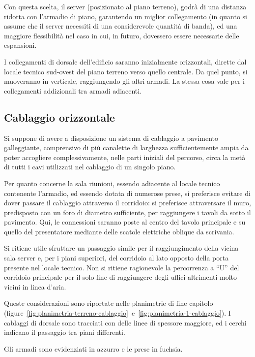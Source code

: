 Con questa scelta, il server (posizionato al piano terreno), godrà di una distanza ridotta con l'armadio di piano, garantendo
un miglior collegamento (in quanto si assume che il server necessiti di una considerevole quantità di banda), ed una maggiore
flessibilità nel caso in cui, in futuro, dovessero essere necessarie delle espansioni.

I collegamenti di dorsale dell'edificio saranno inizialmente orizzontali, dirette dal locale tecnico sud-ovest del piano terreno
verso quello centrale. Da quel punto, si muoveranno in verticale, raggiungendo gli altri armadi. La stessa cosa vale per i collegamenti
addizionali tra armadi adiacenti.

\subsection{Cablaggio orizzontale}

Si suppone di avere a disposizione un sistema di cablaggio a pavimento galleggiante, comprensivo di più canalette di larghezza sufficientemente
ampia da poter accogliere complessivamente, nelle parti iniziali del percorso, circa la metà di tutti i cavi utilizzati nel cablaggio di un singolo piano.

Per quanto concerne la sala riunioni, essendo adiacente al locale tecnico contenente l'armadio, ed essendo dotata di numerose prese,
si preferisce evitare di dover passare il cablaggio attraverso il corridoio: si preferisce attraversare il muro, predisposto con
un foro di diametro sufficiente, per raggiungere i tavoli da sotto il pavimento. Qui, le connessioni saranno poste al centro del tavolo principale
e su quello del presentatore mediante delle scatole elettriche oblique da scrivania.

Si ritiene utile sfruttare un passaggio simile per il raggiungimento della vicina sala server e, per i piani superiori,
del corridoio al lato opposto della porta presente nel locale tecnico. Non si ritiene ragionevole la percorrenza a ``U'' del corridoio
principale per il solo fine di raggiungere degli uffici altrimenti molto vicini in linea d'aria.

Queste considerazioni sono riportate nelle planimetrie di fine capitolo (figure~\ref{fig:planimetria-terreno-cablaggio}~e~\ref{fig:planimetria-1-cablaggio}). I cablaggi di dorsale sono tracciati con delle linee
di spessore maggiore, ed i cerchi indicano il passaggio tra piani differenti.

Gli armadi sono evidenziati in azzurro e le prese in fuchsia.

